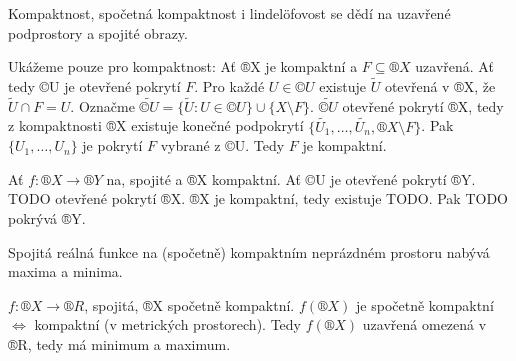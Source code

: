\documentclass[12pt]{article}					%
\begin{document}
    \begin{tvrzeni}
        Kompaktnost, spočetná kompaktnost i lindelöfovost se dědí na uzavřené podprostory a spojité obrazy.

        \begin{dukazin}
            Ukážeme pouze pro kompaktnost: Ať ®X je kompaktní a $F \subseteq ®X$ uzavřená. Ať tedy ©U je otevřené pokrytí $F$. Pro každé $U \in ©U$ existuje $\tilde{U}$ otevřená v ®X, že $\tilde{U} \cap F = U$. Označme $\tilde{©U} = \{\tilde{U}: U \in ©U\} \cup \{X \setminus F\}$. $\tilde{©U}$ otevřené pokrytí ®X, tedy z kompaktnosti ®X existuje konečné podpokrytí $\{\tilde{U_1}, …, \tilde{U_n}, ®X \setminus F\}$. Pak $\{U_1, …, U_n\}$ je pokrytí $F$ vybrané z ©U. Tedy $F$ je kompaktní.

            Ať $f: ®X \rightarrow ®Y$ na, spojité a ®X kompaktní. Ať ©U je otevřené pokrytí ®Y. TODO otevřené pokrytí ®X. ®X je kompaktní, tedy existuje TODO. Pak TODO pokrývá ®Y.
        \end{dukazin}
    \end{tvrzeni}

    \begin{dusledek}
        Spojitá reálná funkce na (spočetně) kompaktním neprázdném prostoru nabývá maxima a minima.

        \begin{dukazin}
            $f: ®X \rightarrow ®R$, spojitá, ®X spočetně kompaktní. $f(®X)$ je spočetně kompaktní $\Leftrightarrow$ kompaktní (v metrických prostorech). Tedy $f(®X)$ uzavřená omezená v ®R, tedy má minimum a maximum.
        \end{dukazin}
    \end{dusledek}
\end{document}
